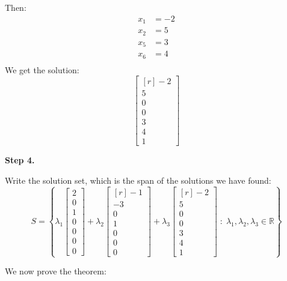 \documentclass[12pt]{article}
\begin{document}
\begin{example}
\begin{enumerate}
$$$$
Then:
\begin{align*}
x_1&=-2\\
x_2&=5\\
x_5&=3\\
x_6&=4\\
\end{align*}
We get the solution:
$$
\begin{bmatrix*}[r]-2\\5\\0\\0\\3\\4\\1\end{bmatrix*}
$$
\end{enumerate}

\textbf{Step 4.}

Write the solution set, which is the span of the solutions we have found:
$$
S=\left\{
\lambda_1\begin{bmatrix}2\\0\\1\\0\\0\\0\\0\end{bmatrix}+
\lambda_2\begin{bmatrix*}[r]-1\\-3\\0\\1\\0\\0\\0\end{bmatrix*}+
\lambda_3\begin{bmatrix*}[r]-2\\5\\0\\0\\3\\4\\1\end{bmatrix*}
\;:\;\lambda_1,\lambda_2,\lambda_3\in\mathbb{R}
\right\}
$$
\end{example}

We now prove the theorem:
\end{document}
